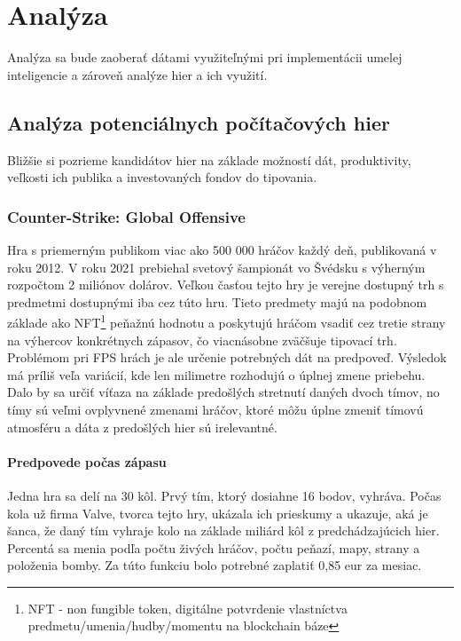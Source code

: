
\chapter{Analýza}

Analýza sa bude zaoberať dátami využiteľnými pri implementácii umelej inteligencie a zároveň analýze hier a ich využití.

\section{Analýza potenciálnych počítačových hier}
Bližšie si pozrieme kandidátov hier na základe možností dát, produktivity, veľkosti ich publika a investovaných fondov do tipovania.

\subsection{Counter-Strike: Global Offensive}
Hra s priemerným publikom viac ako 500 000 hráčov každý deň, publikovaná v roku 2012.\cite{csgoplayers} V roku 2021 prebiehal svetový šampionát vo Švédsku s výherným rozpočtom 2 miliónov dolárov. Veľkou časťou tejto hry je verejne dostupný trh s predmetmi dostupnými iba cez túto hru. Tieto predmety majú na podobnom základe ako NFT\footnote {
	NFT - non fungible token, digitálne potvrdenie vlastníctva predmetu/umenia/hudby/momentu na blockchain báze} peňažnú hodnotu a poskytujú hráčom vsadiť cez tretie strany na výhercov konkrétnych zápasov, čo viacnásobne zväčšuje tipovací trh. Problémom pri FPS hrách je ale určenie potrebných dát na predpoveď. Výsledok má príliš veľa variácií, kde len milimetre rozhodujú o úplnej zmene priebehu. Dalo by sa určiť víťaza na základe predošlých stretnutí daných dvoch tímov, no tímy sú veľmi ovplyvnené zmenami hráčov, ktoré môžu úplne zmeniť tímovú atmosféru a dáta z predošlých hier sú irelevantné.

 \subsubsection{Predpovede počas zápasu}
 Jedna hra sa delí na 30 kôl. Prvý tím, ktorý dosiahne 16 bodov, vyhráva. Počas kola už firma Valve, tvorca tejto hry, ukázala ich prieskumy a ukazuje, aká je šanca, že daný tím vyhraje kolo na základe miliárd kôl z predchádzajúcich hier. Percentá sa menia podľa počtu živých hráčov, počtu peňazí, mapy, strany a položenia bomby. Za túto funkciu bolo potrebné zaplatiť 0,85 eur za mesiac.

